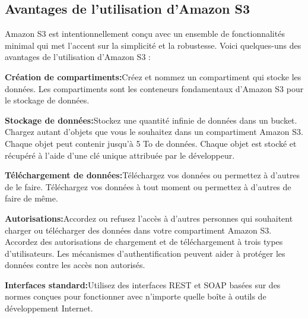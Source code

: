 \subsection{Avantages de l'utilisation d'Amazon S3}
Amazon S3 est intentionnellement conçu avec un ensemble de fonctionnalités minimal qui met l'accent sur la simplicité et la robustesse. Voici quelques-uns des avantages de l'utilisation d'Amazon S3 :
\begin{list}{•}
\item \textbf{Création de compartiments:}Créez et nommez un compartiment qui stocke les données. Les compartiments sont les conteneurs fondamentaux d'Amazon S3 pour le stockage de données.
\item \textbf{Stockage de données:}Stockez une quantité infinie de données dans un bucket. Chargez autant d'objets que vous le souhaitez dans un compartiment Amazon S3. Chaque objet peut contenir jusqu'à 5 To de données. Chaque objet est stocké et récupéré à l'aide d'une clé unique attribuée par le développeur.
\item \textbf{Téléchargement de données:}Téléchargez vos données ou permettez à d'autres de le faire. Téléchargez vos données à tout moment ou permettez à d'autres de faire de même.
\item \textbf{Autorisations:}Accordez ou refusez l'accès à d'autres personnes qui souhaitent charger ou télécharger des données dans votre compartiment Amazon S3. Accordez des autorisations de chargement et de téléchargement à trois types d'utilisateurs. Les mécanismes d'authentification peuvent aider à protéger les données contre les accès non autorisés.
\item \textbf{Interfaces standard:}Utilisez des interfaces REST et SOAP basées sur des normes conçues pour fonctionner avec n'importe quelle boîte à outils de développement Internet.
\end{list}



